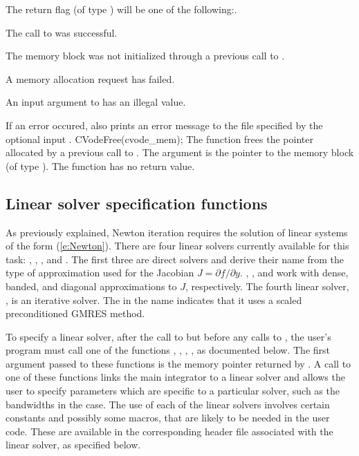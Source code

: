 {
  The return flag  (of type ) will be one of the following:.
  \begin{args}
  \item[\Id{SUCCESS}]
    The call to  was successful.
  \item[\Id{CVM\_NO\_MEM}] 
    The {\cvodes} memory block was not initialized through a previous call to .
  \item[\Id{CVM\_MEM\_FAIL}] 
    A memory allocation request has failed.
  \item[\Id{CVM\_ILL\_INPUT}] 
    An input argument to  has an illegal value.
  \end{args}
}
{
  If an error occured,  also prints an error message to the
  file specified by the optional input .
}
{
  CVodeFree(cvode\_mem);
}
{
  The function  frees the pointer allocated by
  a previous call to .
}
{
  The argument is the pointer to the {\cvodes} memory block (of type ).
}
{
  The function  has no return value.
}
{}
\subsection{Linear solver specification functions}\label{sss:lin_solv_init}

As previously explained, Newton iteration requires the solution of
linear systems of the form (\ref{e:Newton}).  There are four {\cvodes} linear
solvers currently available for this task: {\cvdense}, {\cvband}, {\cvdiag},
and {\cvspgmr}.  The first three are direct solvers and derive their name
from the type of approximation used for the Jacobian 
$J = \partial{f}/\partial{y}$.  {\cvdense}, {\cvband}, and {\cvdiag} work with
dense, banded, and diagonal approximations to $J$, respectively.  The
fourth {\cvodes} linear solver, {\cvspgmr}, is an iterative solver.  The {\spgmr}
in the name indicates that it uses a scaled preconditioned
GMRES method.

To specify a {\cvodes} linear solver, after the call to 
but before any calls to , the user's program must call one
of the functions , , , ,
as documented below. The first argument passed to these functions is the {\cvodes}
memory pointer returned by .  A call to one of these
functions links the main {\cvodes} integrator to a linear solver and
allows the user to specify parameters which are specific to a
particular solver, such as the bandwidths in the {\cvband} case.
The use of each of the linear solvers involves certain constants and possibly 
some macros, that are likely to be needed in the user code.  These are
available in the corresponding header file associated with the linear
solver, as specified below.

